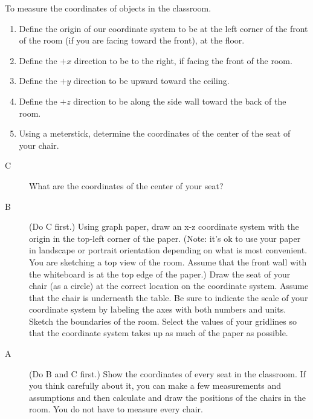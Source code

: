 
\apparatus
{}

\longgoal

To measure the coordinates of objects in the classroom.

\procedure

\begin{enumerate}
	\item Define the origin of our coordinate system to be at the left corner of the front of the room (if you are facing toward the front), at the floor.
	\item Define the $+x$ direction to be to the right, if facing the front of the room.
	\item Define the $+y$ direction to be upward toward the ceiling.
	\item Define the $+z$ direction to be along the side wall toward the back of the room.
	\item Using a meterstick, determine the coordinates of the center of the seat of your chair.
\end{enumerate}

\extension

\begin{description}
	\item [C] What are the coordinates of the center of your seat?
	\item [B] (Do C first.) Using graph paper, draw an x-z coordinate system with the origin in the top-left corner of the paper. (Note: it's ok to use your paper in landscape or portrait orientation depending on what is most convenient. You are sketching a top view of the room. Assume that the front wall with the whiteboard is at the top edge of the paper.) Draw the seat of your chair (as a circle) at the correct location on the coordinate system. Assume that the chair is underneath the table. Be sure to indicate the scale of your coordinate system by labeling the axes with both numbers and units. Sketch the boundaries of the room. Select the values of your gridlines so that the coordinate system takes up as much of the paper as possible.
	\item [A]  (Do B and C first.) Show the coordinates of every seat in the classroom. If you think carefully about it, you can make a few measurements and assumptions and then calculate and draw the positions of the chairs in the room. You do not have to measure every chair.
\end{description}
